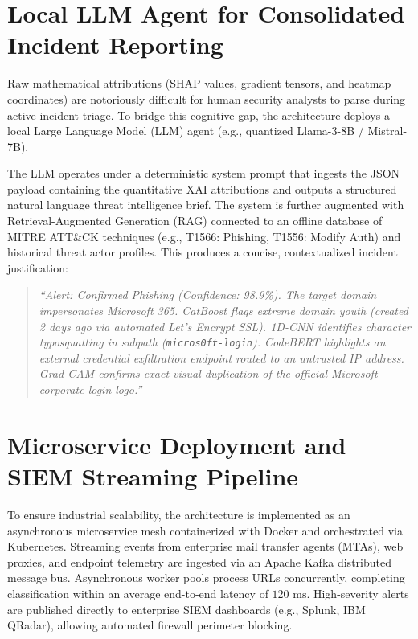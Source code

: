 \section{Local LLM Agent for Consolidated Incident Reporting}
Raw mathematical attributions (SHAP values, gradient tensors, and heatmap coordinates) are notoriously difficult for human security analysts to parse during active incident triage. To bridge this cognitive gap, the architecture deploys a local Large Language Model (LLM) agent (e.g., quantized Llama-3-8B / Mistral-7B).

The LLM operates under a deterministic system prompt that ingests the JSON payload containing the quantitative XAI attributions and outputs a structured natural language threat intelligence brief. The system is further augmented with Retrieval-Augmented Generation (RAG) connected to an offline database of MITRE ATT\&CK techniques (e.g., T1566: Phishing, T1556: Modify Auth) and historical threat actor profiles. This produces a concise, contextualized incident justification:

\begin{quote}
\textit{``Alert: Confirmed Phishing (Confidence: 98.9\%). The target domain impersonates Microsoft 365. CatBoost flags extreme domain youth (created 2 days ago via automated Let's Encrypt SSL). 1D-CNN identifies character typosquatting in subpath (\texttt{micros0ft-login}). CodeBERT highlights an external credential exfiltration endpoint routed to an untrusted IP address. Grad-CAM confirms exact visual duplication of the official Microsoft corporate login logo.''}
\end{quote}

\section{Microservice Deployment and SIEM Streaming Pipeline}
To ensure industrial scalability, the architecture is implemented as an asynchronous microservice mesh containerized with Docker and orchestrated via Kubernetes. Streaming events from enterprise mail transfer agents (MTAs), web proxies, and endpoint telemetry are ingested via an Apache Kafka distributed message bus. Asynchronous worker pools process URLs concurrently, completing classification within an average end-to-end latency of $120\text{ ms}$. High-severity alerts are published directly to enterprise SIEM dashboards (e.g., Splunk, IBM QRadar), allowing automated firewall perimeter blocking.
